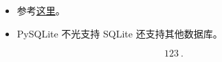 
\begin{issues}
\issueDraft
\end{issues}


\begin{itemize}
\item 参考\href{https://www.sqlitetutorial.net/sqlite-python/}{这里}。
\item PySQLite 不光支持 SQLite 还支持其他数据库。
\end{itemize}

\begin{equation}\label{PySQL}
123~.
\end{equation}

